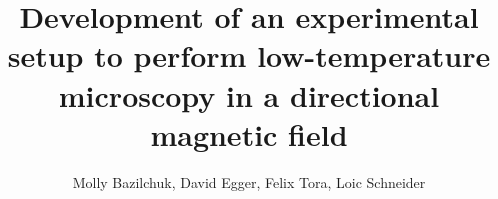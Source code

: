 \documentclass[journal]{IEEEtran}
\begin{document}
%
\title{Development of an experimental setup to perform low-temperature microscopy in a directional magnetic field}
%
%
%

\author{Molly Bazilchuk, 
David Egger, 
Felix Tora, 
Loic Schneider}%

% 
%




% 
\end{document}
